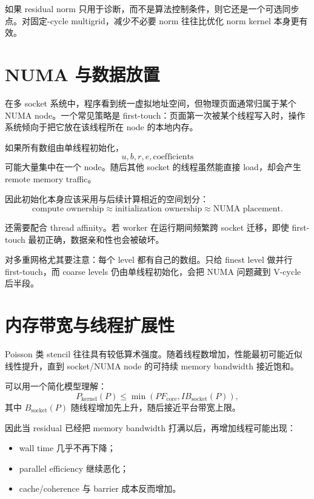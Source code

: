 如果 residual norm 只用于诊断，而不是算法控制条件，则它还是一个可选同步点。对固定-cycle multigrid，减少不必要 norm 往往比优化 norm kernel 本身更有效。

\section{NUMA 与数据放置}

在多 socket 系统中，程序看到统一虚拟地址空间，但物理页面通常归属于某个 NUMA node。一个常见策略是 first-touch：页面第一次被某个线程写入时，操作系统倾向于把它放在该线程所在 node 的本地内存。

如果所有数组由单线程初始化，
\begin{equation}
u,b,r,e,\text{coefficients}
\end{equation}
可能大量集中在一个 node。随后其他 socket 的线程虽然能直接 load，却会产生 remote memory traffic。

因此初始化本身应该采用与后续计算相近的空间划分：
\begin{equation}
\boxed{
\text{compute ownership}
\approx
\text{initialization ownership}
\approx
\text{NUMA placement}.
}
\label{eq:shared-numa-alignment}
\end{equation}

还需要配合 thread affinity。若 worker 在运行期间频繁跨 socket 迁移，即使 first-touch 最初正确，数据亲和性也会被破坏。

对多重网格尤其要注意：每个 level 都有自己的数组。只给 finest level 做并行 first-touch，而 coarse levels 仍由单线程初始化，会把 NUMA 问题藏到 V-cycle 后半段。

\section{内存带宽与线程扩展性}

Poisson 类 stencil 往往具有较低算术强度。随着线程数增加，性能最初可能近似线性提升，直到 socket/NUMA node 的可持续 memory bandwidth 接近饱和。

可以用一个简化模型理解：
\begin{equation}
P_{\mathrm{kernel}}(P)
\le
\min
\left(
P F_{\mathrm{core}},
I B_{\mathrm{socket}}(P)
\right),
\end{equation}
其中 $B_{\mathrm{socket}}(P)$ 随线程增加先上升，随后接近平台带宽上限。

因此当 residual 已经把 memory bandwidth 打满以后，再增加线程可能出现：
\begin{itemize}
\item wall time 几乎不再下降；
\item parallel efficiency 继续恶化；
\item cache/coherence 与 barrier 成本反而增加。
\end{itemize}

